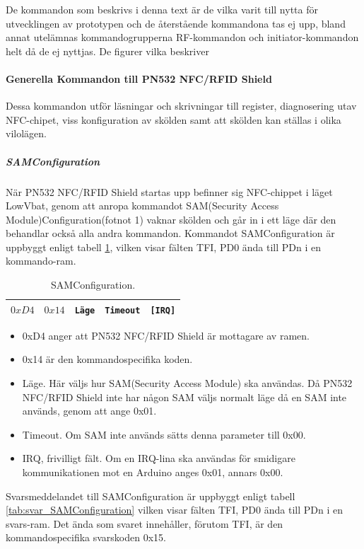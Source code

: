 \documentclass[11pt]{article}
\begin{document}
De kommandon som beskrivs i denna text är de vilka varit till nytta för utvecklingen av prototypen och de återstående kommandona tas ej upp, bland annat utelämnas kommandogrupperna RF-kommandon och initiator-kommandon helt då de ej nyttjas. De figurer vilka beskriver 

\paragraph{Generella Kommandon till PN532 NFC/RFID Shield}
Dessa kommandon utför läsningar och skrivningar till register, diagnosering utav NFC-chipet, viss konfiguration av skölden samt att skölden kan ställas i olika vilolägen. 

\subparagraph{SAMConfiguration}
När PN532 NFC/RFID Shield startas upp befinner sig NFC-chippet i läget LowVbat, genom att anropa kommandot SAM(Security Access Module)Configuration(fotnot 1) vaknar skölden och går in i ett läge där den behandlar också alla andra kommandon. Kommandot SAMConfiguration är uppbyggt enligt tabell \ref{tab:SAMConfiguration}, vilken visar fälten TFI, PD0 ända till PDn i en kommando-ram. 

\begin{table}
\centering
\begin{tabular}{ |c|c|c|c|c| }
\hline
$0xD4$ & $0x14$ & \texttt{Läge} & \texttt{Timeout} & \texttt{[IRQ]}\\
\hline
\end{tabular}
\caption{SAMConfiguration.}
\label{tab:SAMConfiguration}
\end{table}

\begin{itemize}
\item 0xD4 anger att PN532 NFC/RFID Shield är mottagare av ramen.
\item 0x14 är den kommandospecifika koden.
\item Läge. Här väljs hur SAM(Security Access Module) ska användas. Då PN532 NFC/RFID Shield inte har någon SAM väljs normalt läge då en SAM inte används, genom att ange 0x01.
\item Timeout. Om SAM inte används sätts denna parameter till 0x00.
\item IRQ, frivilligt fält. Om en IRQ-lina ska användas för smidigare kommunikationen mot en Arduino anges 0x01, annars 0x00.
\end{itemize}

Svarsmeddelandet till SAMConfiguration är uppbyggt enligt tabell \ref{tab:svar_SAMConfiguration} vilken visar fälten TFI, PD0 ända till PDn i en svars-ram. Det ända som svaret innehåller, förutom TFI,  är den kommandospecifika svarskoden 0x15.
\end{document}
